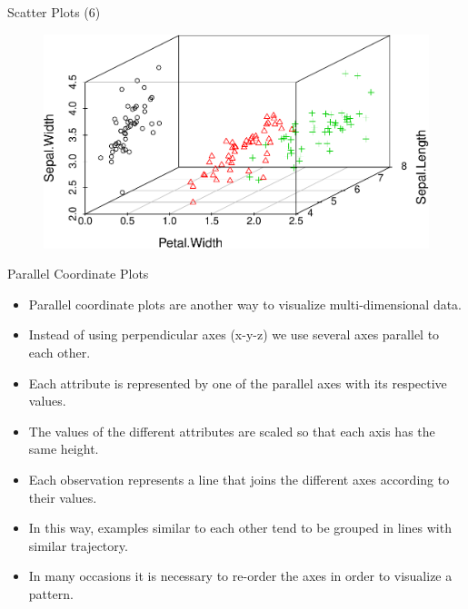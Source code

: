 \documentclass[handout]{beamer}
\begin{document}
\begin{frame}[fragile]{Scatter Plots (6)}

 
 
  \begin{figure}[h!]
	\centering
	\includegraphics[scale=0.6]{pics/scatter3.pdf}		
\end{figure} 
 
 

 
\end{frame}



\begin{frame}[fragile]{Parallel Coordinate Plots}
\scriptsize{
 \begin{itemize}
  \item Parallel coordinate plots are another way to visualize multi-dimensional data.
  \item Instead of using perpendicular axes (x-y-z) we use several axes parallel to each other.
  \item Each attribute is represented by one of the parallel axes with its respective values.
  \item The values of the different attributes are scaled so that each axis has the same height.
  \item  Each observation represents a line that joins the different axes according to their values.
  \item In this way, examples similar to each other tend to be grouped in lines with similar trajectory.
  \item In many occasions it is necessary to re-order the axes in order to visualize a pattern.
 \end{itemize} 
 
 }  
\end{frame}
\end{document}
